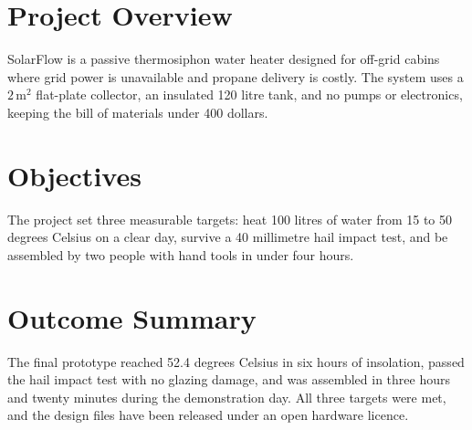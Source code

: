 \documentclass[11pt]{article}
\begin{document}
\section{Project Overview}
SolarFlow is a passive thermosiphon water heater designed for off-grid cabins
where grid power is unavailable and propane delivery is costly. The system
uses a \(2\,\mathrm{m}^2\) flat-plate collector, an insulated 120 litre tank,
and no pumps or electronics, keeping the bill of materials under 400 dollars.

\section{Objectives}
The project set three measurable targets: heat 100 litres of water from 15 to
50 degrees Celsius on a clear day, survive a 40 millimetre hail impact test,
and be assembled by two people with hand tools in under four hours.

\section{Outcome Summary}
The final prototype reached 52.4 degrees Celsius in six hours of insolation,
passed the hail impact test with no glazing damage, and was assembled in three
hours and twenty minutes during the demonstration day. All three targets were
met, and the design files have been released under an open hardware licence.
\end{document}
